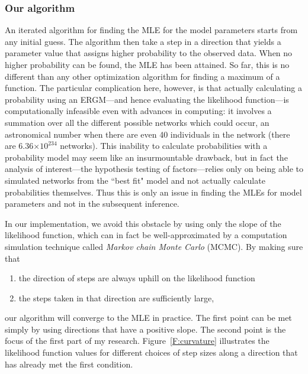 \documentclass[12pt]{article}
\begin{document}

\subsubsection{Our algorithm}
An iterated algorithm for finding the MLE for the model parameters starts 
from any initial guess.  The algorithm then take a step in a direction that 
yields a parameter value that assigns higher probability to the observed data.    
When no higher probability can be found, the MLE has been attained.  
So far, this is no different than any other optimization algorithm for finding 
a maximum of a function.
The particular complication here, however, is that actually calculating a 
probability using an ERGM---and hence evaluating the likelihood 
function---is computationally infeasible even with advances in computing: 
it involves a summation over all the different possible networks which could occur, 
an astronomical number when there are even 40 individuals in the network 
(there are 6.36$\times10^{234}$ networks).  
This inability to calculate probabilities with a probability model may seem 
like an insurmountable drawback,
but in fact the analysis of interest---the hypothesis testing of factors---relies 
only on being able to simulated networks from the ``best fit" model and not 
actually calculate probabilities themselves.  Thus this is 
only an issue in finding the MLEs for model parameters and not in the 
subsequent inference.

In our implementation, we avoid this obstacle by using only the slope of 
the likelihood function, which can in fact be well-approximated by 
a computation simulation technique called \emph{Markov chain Monte Carlo} (MCMC).  
By making sure that
\begin{enumerate}
\item the direction of steps are always uphill on the likelihood function
\item the steps taken in that direction are sufficiently large,
\end{enumerate}
our algorithm will converge to the MLE in practice.  The first point can be met 
simply by using directions that have a positive slope.  The second point is the 
focus of the first part of my research.
Figure~\ref{F:curvature} illustrates the likelihood function values 
for different choices of step sizes along a direction that has already 
met the first condition.  
\end{document}

